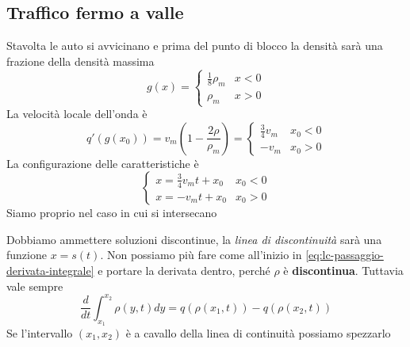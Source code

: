 \documentclass[10pt,a4paper,twoside,openright]{book}
\begin{document}
\subsection{Traffico fermo a valle}

Stavolta le auto si avvicinano e prima del punto di blocco la densità sarà una frazione della densità massima
\begin{equation*}
	g( x) =
	\begin{cases}
		\frac{1}{8} \rho _{m} & x< 0 \\
		\rho _{m}             & x >0 
	\end{cases}
\end{equation*}
La velocità locale dell'onda è
\begin{equation*}
	q'( g( x_{0})) =v_{m}\left( 1-\frac{2\rho }{\rho _{m}}\right) =
	\begin{cases}
		\frac{3}{4} v_{m} & x_{0} < 0 \\
		-v_{m}            & x_{0}  >0 
	\end{cases}
\end{equation*}
La configurazione delle caratteristiche è
\begin{equation*}
	\begin{cases}
		x=\frac{3}{4} v_{m} t+x_{0} & x_{0} < 0 \\
		x=-v_{m} t+x_{0}            & x_{0}  >0 
	\end{cases}
\end{equation*}
Siamo proprio nel caso in cui si intersecano


Dobbiamo ammettere soluzioni discontinue, la \textit{linea di discontinuità} sarà una funzione $x=s( t)$. Non possiamo più fare come all'inizio in \eqref{eq:lc-passaggio-derivata-integrale} e portare la derivata dentro, perché $\rho $ è \textbf{discontinua}. Tuttavia vale sempre
\begin{equation*}
	\frac{d}{dt}\int ^{x_{2}}_{x_{1}} \rho ( y,t) dy=q( \rho ( x_{1} ,t)) -q( \rho ( x_{2} ,t))
\end{equation*}
Se l'intervallo $( x_{1} ,x_{2})$ è a cavallo della linea di continuità possiamo spezzarlo
\end{document}
